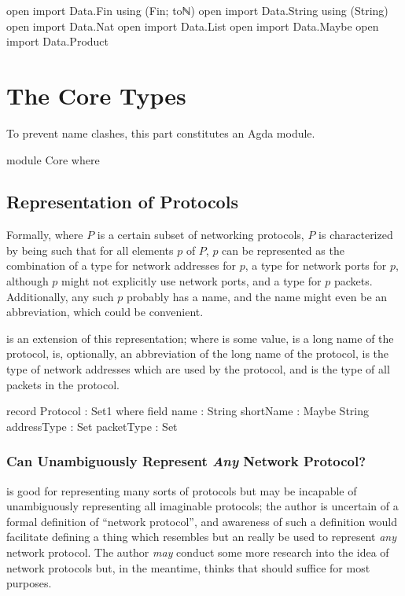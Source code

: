 \documentclass{report}
\begin{document}
\begin{code}
open import Data.Fin using (Fin; toℕ)
open import Data.String using (String)
open import Data.Nat
open import Data.List
open import Data.Maybe
open import Data.Product
\end{code}

\part{The Core Types}
To prevent name clashes, this part constitutes an Agda module.

\begin{code}
module Core where
\end{code}

\chapter{Representation of Protocols}
Formally, where \(P\) is a certain subset of networking protocols, \(P\) is characterized by being such that for all elements \(p\) of \(P\), \(p\) can be represented as the combination of a type for network addresses for \(p\), a type for network ports for \(p\), although \(p\) might not explicitly use network ports, and a type for \(p\) packets.  Additionally, any such \(p\) probably has a name, and the name might even be an abbreviation, which could be convenient.

 is an extension of this representation; where  is some  value,   is a long name of the  protocol,   is, optionally, an abbreviation of the long name of the  protocol,   is the type of network addresses which are used by the  protocol, and   is the type of all packets in the  protocol.

\begin{code}
  record Protocol : Set1 where
    field
      name : String
      shortName : Maybe String
      addressType : Set
      packetType : Set
\end{code}

\section{Can  Unambiguously Represent \emph{Any} Network Protocol?}
 is good for representing many sorts of protocols but may be incapable of unambiguously representing all imaginable protocols; the author is uncertain of a formal definition of ``network protocol'', and awareness of such a definition would facilitate defining a thing which resembles  but an really be used to represent \emph{any} network protocol.  The author \emph{may} conduct some more research into the idea of network protocols but, in the meantime, thinks that  should suffice for most purposes.
\end{document}

